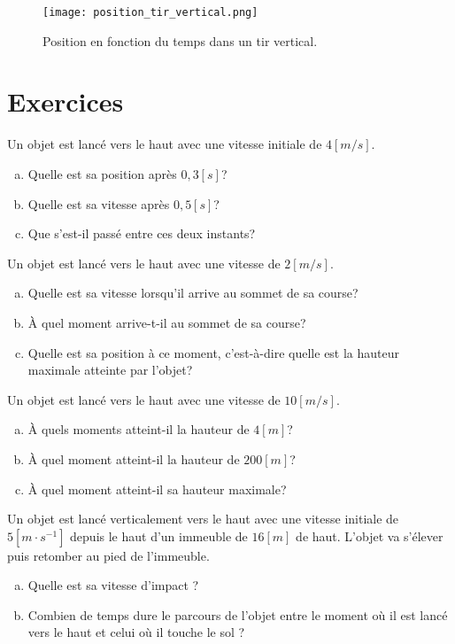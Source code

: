 \begin{figure}[h!]
  \centering
  \texttt{[image: position\_tir\_vertical.png]}
  \caption{Position en fonction du temps dans un tir vertical.}
  \label{position_tir_vertical}
\end{figure}

\newpage

\section{Exercices}
\begin{exercise}
  Un objet est lancé vers le haut avec une vitesse initiale de \(4[m/s]\).
  \begin{enumerate}[a)]
    \item Quelle est sa position après \(0,3[s]\)?
    \item Quelle est sa vitesse après \(0,5[s]\)?
    \item Que s'est-il passé entre ces deux instants?
  \end{enumerate}
\end{exercise}

\begin{exercise}
  Un objet est lancé vers le haut avec une vitesse de \(2[m/s]\).
  \begin{enumerate}[a)]
    \item Quelle est sa vitesse lorsqu'il arrive au sommet de sa course?
    \item À quel moment arrive-t-il au sommet de sa course?
    \item Quelle est sa position à ce moment, c'est-à-dire quelle est la hauteur maximale atteinte par l'objet?
  \end{enumerate}
\end{exercise}

\begin{exercise}
  Un objet est lancé vers le haut avec une vitesse de \(10 [m/s]\).
  \begin{enumerate}[a)]
    \item À quels moments atteint-il la hauteur de \(4[m]\)?
    \item À quel moment atteint-il la hauteur de \(200[m]\)?
    \item À quel moment atteint-il sa hauteur maximale?
  \end{enumerate}
\end{exercise}

\begin{exercise}
  Un objet est lancé verticalement vers le haut avec une vitesse initiale de \(5[m \cdot s^{-1}]\) depuis le haut d'un immeuble de \(16[m]\) de haut. L'objet va s'élever puis retomber au pied de l'immeuble.
  \begin{enumerate}[a)]
    \item        Quelle est sa vitesse d'impact ?
    \item       Combien de temps dure le parcours de l'objet entre le moment où il est lancé vers le haut et celui où il touche le sol ?
  \end{enumerate}
\end{exercise}

